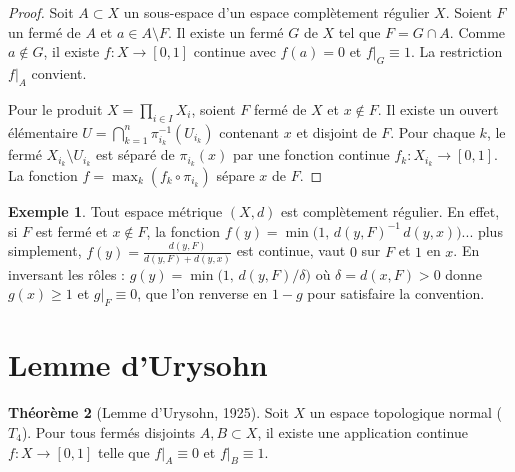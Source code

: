 \documentclass[12pt,a4paper,openany]{book}
\theoremstyle{definition}
\theoremstyle{cours}
\newtheorem{theoreme}{Théorème}[chapter]
\theoremstyle{coursnormal}
\newtheorem{exemple}[theoreme]{Exemple}
\begin{document}
\begin{proof}
Soit $A\subset X$ un sous-espace d'un espace complètement régulier $X$.
Soient $F$ un fermé de $A$ et $a\in A\setminus F$. Il existe un fermé
$G$ de $X$ tel que $F=G\cap A$. Comme $a\notin G$, il existe
$f\colon X\to[0,1]$ continue avec $f(a)=0$ et $f|_G\equiv 1$.
La restriction $f|_A$ convient.

Pour le produit $X=\prod_{i\in I}X_i$, soient $F$ fermé de $X$ et
$x\notin F$. Il existe un ouvert élémentaire
$U=\bigcap_{k=1}^n \pi_{i_k}^{-1}(U_{i_k})$ contenant $x$ et disjoint
de $F$. Pour chaque $k$, le fermé $X_{i_k}\setminus U_{i_k}$ est séparé
de $\pi_{i_k}(x)$ par une fonction continue $f_k\colon X_{i_k}\to[0,1]$.
La fonction $f=\max_k(f_k\circ\pi_{i_k})$ sépare $x$ de $F$.
\end{proof}

\begin{exemple}
\label{ex:metrique-completement-regulier}
Tout espace métrique $(X,d)$ est complètement régulier. En effet,
si $F$ est fermé et $x\notin F$, la fonction
$f(y)=\min\!\bigl(1,\,d(y,F)^{-1}\,d(y,x)\bigr)$... plus simplement,
$f(y)=\frac{d(y,F)}{d(y,F)+d(y,x)}$ est continue, vaut $0$ sur $F$
et $1$ en $x$. En inversant les rôles :
$g(y)=\min\!\bigl(1,\,d(y,F)\big/\delta\bigr)$ où
$\delta=d(x,F)>0$ donne $g(x)\ge 1$ et $g|_F\equiv 0$, que l'on
renverse en $1-g$ pour satisfaire la convention.
\end{exemple}

\section{Lemme d'Urysohn}
\label{sec:lemme-urysohn}

\begin{theoreme}[Lemme d'Urysohn, 1925]
\label{thm:urysohn}
Soit $X$ un espace topologique normal ($T_4$).
Pour tous fermés disjoints $A,B\subset X$, il existe une application
continue $f\colon X\to [0,1]$ telle que $f|_A\equiv 0$ et $f|_B\equiv 1$.
\end{theoreme}
\end{document}
